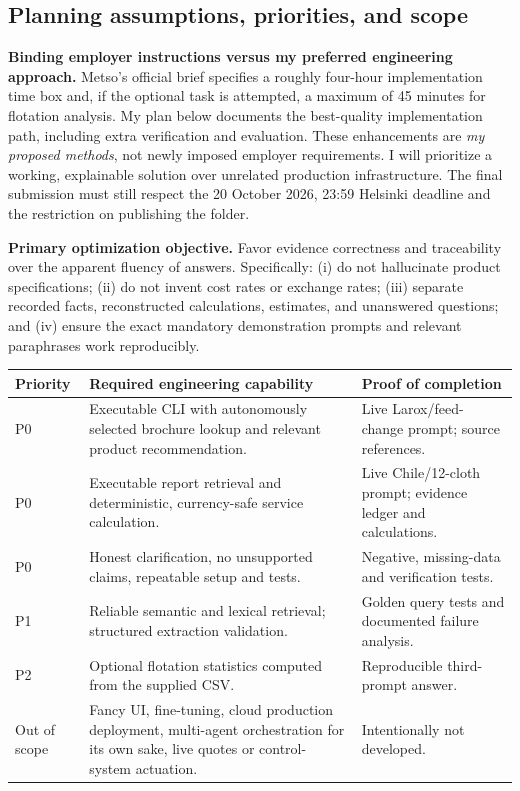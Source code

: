 \documentclass[11pt,a4paper]{article}
\DeclareRobustCommand{\code}[1]{{\ttfamily\small\detokenize{#1}}}
\begin{document}
\subsection{Planning assumptions, priorities, and scope}
\textbf{Binding employer instructions versus my preferred engineering approach.} Metso's official brief specifies a roughly four-hour implementation time box and, if the optional task is attempted, a maximum of 45 minutes for flotation analysis. My plan below documents the best-quality implementation path, including extra verification and evaluation. These enhancements are \emph{my proposed methods}, not newly imposed employer requirements. I will prioritize a working, explainable solution over unrelated production infrastructure. The final submission must still respect the 20 October 2026, 23:59 Helsinki deadline and the restriction on publishing the \code{data/} folder.

\textbf{Primary optimization objective.} Favor evidence correctness and traceability over the apparent fluency of answers. Specifically: (i) do not hallucinate product specifications; (ii) do not invent cost rates or exchange rates; (iii) separate recorded facts, reconstructed calculations, estimates, and unanswered questions; and (iv) ensure the exact mandatory demonstration prompts and relevant paraphrases work reproducibly.

\begin{tabularx}{\textwidth}{@{}L{31mm}Y L{37mm}@{}}
\toprule\textbf{Priority} & \textbf{Required engineering capability} & \textbf{Proof of completion}\\\midrule
P0 & Executable CLI with autonomously selected brochure lookup and relevant product recommendation. & Live Larox/feed-change prompt; source references.\\
P0 & Executable report retrieval and deterministic, currency-safe service calculation. & Live Chile/12-cloth prompt; evidence ledger and calculations.\\
P0 & Honest clarification, no unsupported claims, repeatable setup and tests. & Negative, missing-data and verification tests.\\
P1 & Reliable semantic and lexical retrieval; structured extraction validation. & Golden query tests and documented failure analysis.\\
P2 & Optional flotation statistics computed from the supplied CSV. & Reproducible third-prompt answer.\\
Out of scope & Fancy UI, fine-tuning, cloud production deployment, multi-agent orchestration for its own sake, live quotes or control-system actuation. & Intentionally not developed.\\
\bottomrule
\end{tabularx}
\end{document}
